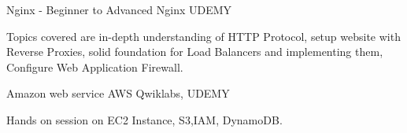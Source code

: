 

\begin{cventries}

  \cventry
    {Nginx - Beginner to Advanced} %
    {Nginx} %
    {UDEMY} %
    {} %
    {
      \begin{cvitems} %
        \item {Topics covered are in-depth understanding of HTTP Protocol, setup website with Reverse Proxies, solid foundation for Load Balancers and implementing them, Configure Web Application Firewall.}
      \end{cvitems}
    }

  \cventry
    {Amazon web service} %
    {AWS} %
    {Qwiklabs, UDEMY} %
    {} %
    {
      \begin{cvitems} %
        \item {Hands on session on EC2 Instance, S3,IAM, DynamoDB.}
      \end{cvitems}
    }

\end{cventries}
